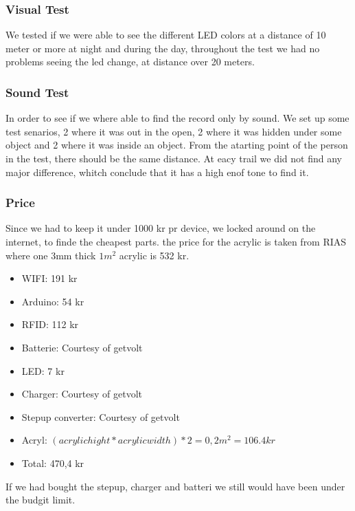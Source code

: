 \subsubsection{Visual Test}
We tested if we were able to see the different LED colors at a distance of 10 meter or more at night and during the day, throughout the test we had no problems seeing the led change, at distance over 20 meters.

\subsubsection{Sound Test}
In order to see if we where able to find the record only by sound.
We set up some test senarios, 2 where it was out in the open, 2 where it was hidden under some object and 2 where it was inside an object. From the atarting point of the person in the test, there should be the same distance.
At eacy trail we did not find any major difference, whitch conclude that it has a high enof tone to find it.

\subsubsection{Price}
Since we had to keep it under 1000 kr pr device, we locked around on the internet, to finde the cheapest parts.
the price for the acrylic is taken from RIAS \cite{RIAS} where one 3mm thick $1 m^2$ acrylic is 532 kr.
\begin{itemize} \itemsep0em
	 \item WIFI: 191 kr \cite{Adafruit}
	 \item Arduino: 54 kr \cite{Sparkfun}
	 \item RFID: 112 kr \cite{Let-Eletronik}
	 \item Batterie: Courtesy of getvolt  \cite{Getvolt}
	 \item LED: 7 kr \cite{Adafruit}
	 \item Charger: Courtesy of getvolt \cite{Getvolt}
	 \item Stepup converter: Courtesy of getvolt  \cite{Getvolt}
	  \item Acryl: $(acrylic hight * acrylic width)*2 = 0,2 m^2 = 106.4 kr $ \cite{RIAS}
	 \item Total: 470,4 kr
\end{itemize}
If we had bought the stepup, charger and batteri we still would have been under the budgit limit.
